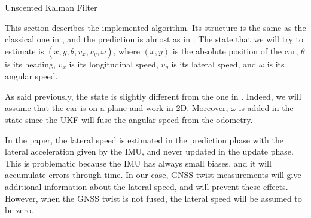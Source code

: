 \documentclass[10pt,a4paper, twocolumn]{article}
\begin{document}
\begin{algorithm}[h]
	\SetAlgoNoLine
	\DontPrintSemicolon
	\SetNlSkip{12pt}
	
	
	\caption{Unscented Kalman Filter}
	\label{algo:UKF}
\end{algorithm}

This section describes the implemented algorithm. Its structure is the same as the classical one in \cite{ProbabilisticRobotics}, and the prediction is almost as in \cite{RobustVehicleLocalization}. The state that we will try to estimate is $(x, y, \theta, v_x, v_y,  \omega)$, where $(x, y)$ is the absolute position of the car, $\theta$ is its heading, $v_x$ is its longitudinal speed, $v_y$ is its lateral speed, and $\omega$ is its angular speed.

As said previously, the state is slightly different from the one in \cite{RobustVehicleLocalization}. Indeed, we will assume that the car is on a plane and work in 2D. Moreover, $\omega$ is added in the state since the UKF will fuse the angular speed from the odometry.

In the paper, the lateral speed is estimated in the prediction phase with the lateral acceleration given by the IMU, and never updated in the update phase. This is problematic because the IMU has always small biases, and it will accumulate errors through time. In our case, GNSS twist measurements will give additional information about the lateral speed, and will prevent these effects. However, when the GNSS twist is not fused, the lateral speed will be assumed to be zero.\\
\end{document}
